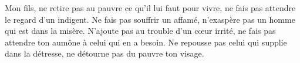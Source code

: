 Mon fils, ne retire pas au pauvre ce qu’il lui faut pour vivre,
	ne fais pas attendre le regard d’un indigent.
Ne fais pas souffrir un affamé,
	n’exaspère pas un homme qui est dans la misère.
N’ajoute pas au trouble d’un cœur irrité,
	ne fais pas attendre ton aumône à celui qui en a besoin.
Ne repousse pas celui qui supplie dans la détresse,
	ne détourne pas du pauvre ton visage.

